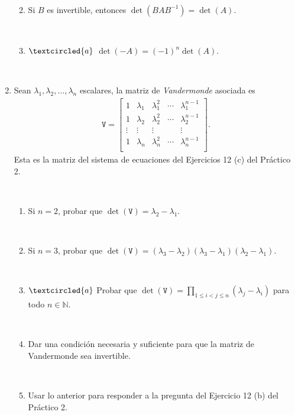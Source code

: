 \documentclass[12pt]{amsart}
\begin{document}
\begin{enumerate}
\begin{enumerate}
	\
	
	\item Si $B$ es invertible, entonces $\det(B A B^{-1}) = \det (A)$.
	
	\
	
		\item\label{-A} $\textcircled{a}$ $\det(-A) = (-1)^n\det (A)$.
\end{enumerate}

\

\item\label{vandermonde} Sean $\lambda_1, \lambda_2, \dots, \lambda_n$ escalares, la matriz de \emph{Vandermonde} asociada es
\begin{align*}
\mathtt V = \begin{bmatrix}
1 & \lambda_1 & \lambda_1^2 & \cdots & \lambda_1^{n-1}\\
1 & \lambda_2 & \lambda_2^2 & \cdots & \lambda_2^{n-1}\\
\vdots &\vdots &\vdots & &\vdots\\
1 & \lambda_n & \lambda_n^2 & \cdots & \lambda_n^{n-1}\\
\end{bmatrix}.
\end{align*}
Esta es la matriz del sistema de ecuaciones del Ejercicios 12 (c) del Pr\'actico 2.

\

\begin{enumerate}
\item Si $n=2$, probar que $\det(\mathtt V) = \lambda_2-\lambda_1$.

\

\item Si $n=3$, probar que $\det(\mathtt V) = (\lambda_3-\lambda_2) (\lambda_3-\lambda_1) (\lambda_2-\lambda_1)$.

\

\item\label{vandermonde gral} $\textcircled{a}$ Probar que $\det(\mathtt V) = \prod_{1\leq i< j \leq n}(\lambda_j-\lambda_i)$ para todo $n\in\mathbb{N}$.

\

\item Dar una condici\'on necesaria y suficiente para que la matriz de Vandermonde sea invertible.

\

\item Usar lo anterior para responder a la pregunta del Ejercicio 12 (b) del Pr\'actico 2.
\end{enumerate}


\end{enumerate}
\end{document}
